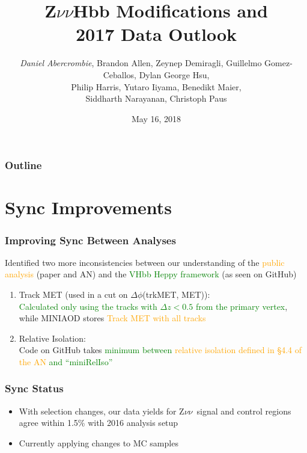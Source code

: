 \documentclass{beamer}
\author[D. Abercrombie]{
  \emph{Daniel Abercrombie}, Brandon Allen, Zeynep Demiragli,
  Guillelmo Gomez-Ceballos, Dylan George Hsu, \\
  Philip Harris, Yutaro Iiyama, Benedikt Maier, \\
  Siddharth Narayanan, Christoph Paus
}
\title{\bf \sffamily Z$\nu\nu$Hbb Modifications and \\ 2017 Data Outlook}
\date{May 16, 2018}
\newcommand{\Znn}{Z$\nu\nu$~}
\begin{document}
\begin{frame}[nonumbering]
  \titlepage
\end{frame}

\begin{frame}
  \frametitle{Outline}
  \tableofcontents
\end{frame}

\section{Sync Improvements}

\begin{frame}
  \tableofcontents[currentsection]
\end{frame}

\begin{frame}
  \frametitle{Improving Sync Between Analyses}

  Identified two more inconsistencies between our understanding of the
  \textcolor{orange}{public analysis}
  (paper and AN) and the \textcolor{green}{VHbb Heppy framework} (as seen on GitHub)

  \begin{enumerate}
  \item Track MET (used in a cut on $\Delta\phi$(trkMET, MET)): \\
    \textcolor{green}
              {Calculated only using the tracks with $\Delta z < 0.5$ from the primary vertex},
    while MINIAOD stores \textcolor{orange}{Track MET with all tracks}
  \item Relative Isolation: \\
    Code on GitHub takes \textcolor{green}{minimum between}
    \textcolor{orange}{relative isolation defined in \S4.4 of the AN}
    \textcolor{green}{and ``miniRelIso''}
  \end{enumerate}

\end{frame}

\begin{frame}
  \frametitle{Sync Status}

  \begin{itemize}
  \item With selection changes, our data yields for \Znn signal and
    control regions agree within 1.5\% with 2016 analysis setup
  \item Currently applying changes to MC samples
  \end{itemize}

\end{frame}
\end{document}
